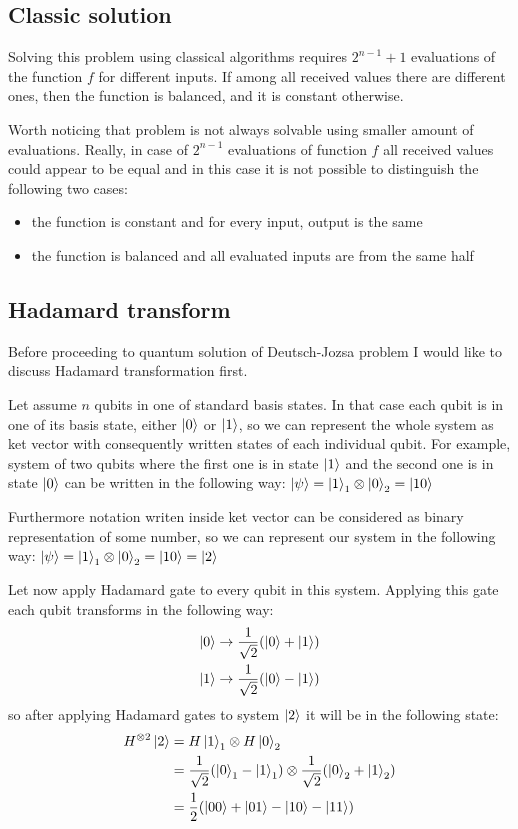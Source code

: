 \subsection{Classic solution}

Solving this problem using classical algorithms requires $2^{n-1} + 1$ evaluations of the function $f$ for different inputs.
If among all received values there are different ones, then the function is balanced, and it is constant otherwise.

Worth noticing that problem is not always solvable using smaller amount of evaluations.
Really, in case of $2^{n-1}$ evaluations of function $f$ all received values could appear to be equal and in this case it is not possible to distinguish the following two cases:
\begin{itemize}
    \item the function is constant and for every input, output is the same
    \item the function is balanced and all evaluated inputs are from the same half
\end{itemize}

\subsection{Hadamard transform}\label{subsec:h_transform}

Before proceeding to quantum solution of Deutsch-Jozsa problem I would like to discuss Hadamard transformation first.

Let assume $n$ qubits in one of standard basis states.
In that case each qubit is in one of its basis state, either $\ket{0}$ or $\ket{1}$, so we can represent the whole system as ket vector with consequently written states of each individual qubit.
For example, system of two qubits where the first one is in state $\ket{1}$ and the second one is in state $\ket{0}$ can be written in the following way: $\ket{\psi} = \ket{1}_1 \otimes \ket{0}_2 = \ket{10}$

Furthermore notation writen inside ket vector can be considered as binary representation of some number, so we can represent our system in the following way: $\ket{\psi} = \ket{1}_1 \otimes \ket{0}_2 = \ket{10} = \ket{2}$

Let now apply Hadamard gate to every qubit in this system.
Applying this gate each qubit transforms in the following way:
\begin{align*}
    \ket{0} \rightarrow \frac{1}{\sqrt {2}}(\ket{0} + \ket{1}) \\
    \ket{1} \rightarrow \frac{1}{\sqrt {2}}(\ket{0} - \ket{1})
\end{align*}
so after applying Hadamard gates to system $\ket{2}$ it will be in the following state:
\begin{align*}
    H^{\otimes 2}\ket{2} &= H\ket{1}_1 \otimes H\ket{0}_2 \\
    &= \frac{1}{\sqrt {2}}(\ket{0}_1 - \ket{1}_1) \otimes \frac{1}{\sqrt {2}}(\ket{0}_2 + \ket{1}_2) \\
    &= \frac{1}{2} (\ket{00} + \ket{01} - \ket{10} - \ket{11})
\end{align*}

